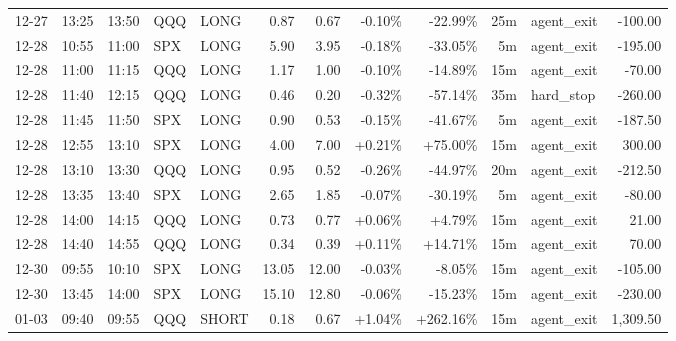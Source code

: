 \documentclass[11pt,a4paper]{article}
\begin{document}
\begin{center}
\begin{longtable}{>{\color{txtmain}}l l l l l r r r r r >{\color{txtmain}}l r}
12-27 & 13:25 & 13:50 & QQQ & LONG & 0.87 & 0.67 & \textcolor{lossred}{-0.10\%} & \textcolor{lossred}{-22.99\%} & 25m & agent\_exit & \textcolor{lossred}{-100.00} \\
12-28 & 10:55 & 11:00 & SPX & LONG & 5.90 & 3.95 & \textcolor{lossred}{-0.18\%} & \textcolor{lossred}{-33.05\%} & 5m & agent\_exit & \textcolor{lossred}{-195.00} \\
12-28 & 11:00 & 11:15 & QQQ & LONG & 1.17 & 1.00 & \textcolor{lossred}{-0.10\%} & \textcolor{lossred}{-14.89\%} & 15m & agent\_exit & \textcolor{lossred}{-70.00} \\
12-28 & 11:40 & 12:15 & QQQ & LONG & 0.46 & 0.20 & \textcolor{lossred}{-0.32\%} & \textcolor{lossred}{-57.14\%} & 35m & hard\_stop & \textcolor{lossred}{-260.00} \\
12-28 & 11:45 & 11:50 & SPX & LONG & 0.90 & 0.53 & \textcolor{lossred}{-0.15\%} & \textcolor{lossred}{-41.67\%} & 5m & agent\_exit & \textcolor{lossred}{-187.50} \\
12-28 & 12:55 & 13:10 & SPX & LONG & 4.00 & 7.00 & \textcolor{wingreen}{+0.21\%} & \textcolor{wingreen}{+75.00\%} & 15m & agent\_exit & \textcolor{wingreen}{300.00} \\
12-28 & 13:10 & 13:30 & QQQ & LONG & 0.95 & 0.52 & \textcolor{lossred}{-0.26\%} & \textcolor{lossred}{-44.97\%} & 20m & agent\_exit & \textcolor{lossred}{-212.50} \\
12-28 & 13:35 & 13:40 & SPX & LONG & 2.65 & 1.85 & \textcolor{lossred}{-0.07\%} & \textcolor{lossred}{-30.19\%} & 5m & agent\_exit & \textcolor{lossred}{-80.00} \\
12-28 & 14:00 & 14:15 & QQQ & LONG & 0.73 & 0.77 & \textcolor{wingreen}{+0.06\%} & \textcolor{wingreen}{+4.79\%} & 15m & agent\_exit & \textcolor{wingreen}{21.00} \\
12-28 & 14:40 & 14:55 & QQQ & LONG & 0.34 & 0.39 & \textcolor{wingreen}{+0.11\%} & \textcolor{wingreen}{+14.71\%} & 15m & agent\_exit & \textcolor{wingreen}{70.00} \\
12-30 & 09:55 & 10:10 & SPX & LONG & 13.05 & 12.00 & \textcolor{lossred}{-0.03\%} & \textcolor{lossred}{-8.05\%} & 15m & agent\_exit & \textcolor{lossred}{-105.00} \\
12-30 & 13:45 & 14:00 & SPX & LONG & 15.10 & 12.80 & \textcolor{lossred}{-0.06\%} & \textcolor{lossred}{-15.23\%} & 15m & agent\_exit & \textcolor{lossred}{-230.00} \\
01-03 & 09:40 & 09:55 & QQQ & SHORT & 0.18 & 0.67 & \textcolor{wingreen}{+1.04\%} & \textcolor{wingreen}{+262.16\%} & 15m & agent\_exit & \textcolor{wingreen}{1,309.50} \\

\end{longtable}
\end{center}
\end{document}
